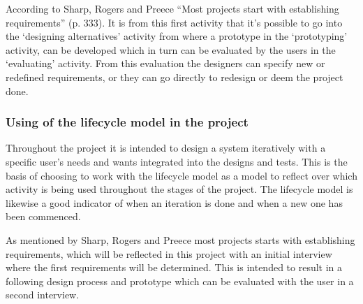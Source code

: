 According to Sharp, Rogers and Preece “Most projects start with establishing requirements” (p. 333). It is from this first activity that it’s possible to go into the ‘designing alternatives’ activity from where a prototype in the ‘prototyping’ activity, can be developed which in turn can be evaluated by the users in the ‘evaluating’ activity. From this evaluation the designers can specify new or redefined requirements, or they can go directly to redesign or deem the project done.
\subsubsection{Using of the lifecycle model in the project}
Throughout the project it is intended to design a system iteratively with a specific user’s needs and wants integrated into the designs and tests. This is the basis of choosing to work with the lifecycle model as a model to reflect over which activity is being used throughout the stages of the project. The lifecycle model is likewise a good indicator of when an iteration is done and when a new one has been commenced.

As mentioned by Sharp, Rogers and Preece most projects starts with establishing requirements, which will be reflected in this project with an initial interview where the first requirements will be determined. This is intended to result in a following design process and prototype which can be evaluated with the user in a second interview.

